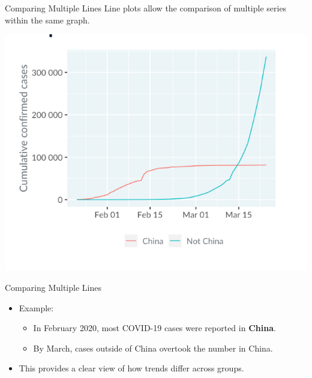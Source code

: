 \documentclass[
  ignorenonframetext,
]{beamer}
\begin{document}
\begin{frame}{Comparing Multiple Lines}
\label{comparing-multiple-lines}
Line plots allow the comparison of multiple series within the same
graph.

\includegraphics{../images/im42.png}
\end{frame}

\begin{frame}{Comparing Multiple Lines}
\label{comparing-multiple-lines-1}
\begin{itemize}
\item
  Example:

  \begin{itemize}
  \item
    In February 2020, most COVID-19 cases were reported in
    \textbf{China}.
  \item
    By March, cases outside of China overtook the number in China.
  \end{itemize}
\item
  This provides a clear view of how trends differ across groups.
\end{itemize}
\end{frame}
\end{document}

